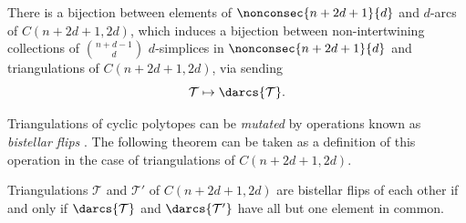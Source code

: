 \begin{theorem}
There is a bijection between elements of $\nonconsec{n + 2d + 1}{d}$ and $d$-arcs of $C(n + 2d + 1, 2d)$, which induces a bijection between non-intertwining collections of $\binom{n + d - 1}{d}$ $d$-simplices in $\nonconsec{n + 2d + 1}{d}$ and triangulations of $C(n + 2d + 1, 2d)$, via sending \[\mathcal{T} \mapsto \darcs{\mathcal{T}}.\]
\end{theorem}

Triangulations of cyclic polytopes can be \emph{mutated} by operations known as \emph{bistellar flips} \cite[Section~2.4]{lrs}. The following theorem can be taken as a definition of this operation in the case of triangulations of $C(n + 2d + 1, 2d)$.

\begin{theorem}[{\cite[Theorem~4.1]{ot}}]\label{thm:flip}
Triangulations $\mathcal{T}$ and $\mathcal{T}'$ of $C(n + 2d + 1,2d)$ are bistellar flips of each other if and only if $\darcs{\mathcal{T}}$ and $\darcs{\mathcal{T}'}$ have all but one element in common.
\end{theorem}
